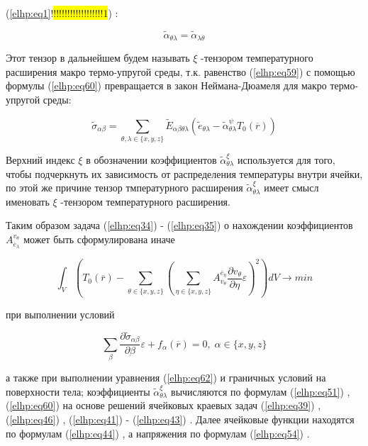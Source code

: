 (\ref{elhp:eq1}!\colorbox{yellow}{!!!!!!!!!!!!!!!!!!1})
:

\begin{equation}
    \label{elhp:eq61}
    \widetilde{\alpha}_{ \theta\lambda} =
    \widetilde{\alpha}_{ \lambda\theta}
\end{equation}

Этот тензор в дальнейшем будем называть 
$\xi$
-тензором температурного расширения макро
термо-упругой среды, т.к. равенство 
(\ref{elhp:eq59})
с помощью формулы 
(\ref{elhp:eq60})
превращается в закон
Неймана-Дюамеля для макро термо-упругой среды:

\begin{equation}
    \label{elhp:eq62}
    \widetilde{\sigma}_{ \alpha\beta} =
    \sum_{ \theta,\lambda \in \{x,y,z\} }
    \widetilde{E}_{ \alpha\beta \theta\lambda}
    \left( 
    \widetilde{e}_{ \theta\lambda} -
    \widetilde{\alpha}_{ \theta\lambda}^{\psi} 
    T_0 \left( \overline{r}  \right) 
    \right) 
\end{equation}

Верхний индекс 
$\xi$
в обозначении коэффициентов 
$ \widetilde{\alpha}_{ \theta\lambda}^{\xi}$
используется для того, чтобы
подчеркнуть их зависимость от распределения температуры внутри ячейки, по этой же
причине тензор тмпературного расширения 
$ \widetilde{\alpha}_{ \theta\lambda}^{\xi}$
имеет смысл именовать 
$\xi$
-тензором
температурного расширения.

Таким образом задача 
(\ref{elhp:eq34})
-
(\ref{elhp:eq35})
о нахождении коэффициентов 
$ {A}_{ \overline{e}_{\lambda}}^{ v_{\theta}} $
может быть сформулирована иначе

\begin{equation}
    \label{elhp:eq63}
    \int_V
    \left( 
        T_0 \left( \overline{r}  \right) -
        \sum_{ \theta \in \{x,y,z\} }
        \left( 
            \sum_{ \eta \in \{x,y,z\} }
            A_{v_{\theta}}^{ \overline{e}_{\eta}}
            \frac{ \partial v_{\theta}}{ \partial \eta}
            \varepsilon
        \right)^2
    \right) 
    dV \rightarrow min
\end{equation}

при выполнении условий

\begin{equation}
    \label{elhp:eq64}
        \sum_{\beta} \frac{ \partial \widetilde{\sigma}_{ \alpha\beta}} { \partial \beta}
            \varepsilon + f_{\alpha} \left( \overline{r}  \right) = 0
            , \; \alpha \in \{x,y,z\}
\end{equation}

а также при выполнении уравнения 
(\ref{elhp:eq62})
и граничных условий на поверхности тела;
коэффициенты 
$ \widetilde{\alpha}_{ \theta\lambda}^{\xi}$
вычисляются по формулам 
(\ref{elhp:eq51})
, 
(\ref{elhp:eq60})
на основе решений ячейковых
краевых задач 
(\ref{elhp:eq39})
, 
(\ref{elhp:eq46})
, 
(\ref{elhp:eq41})
-
(\ref{elhp:eq43})
. Далее ячейковые функции находятся по формулам 
(\ref{elhp:eq44})
,
а напряжения по формулам 
(\ref{elhp:eq54})
.
